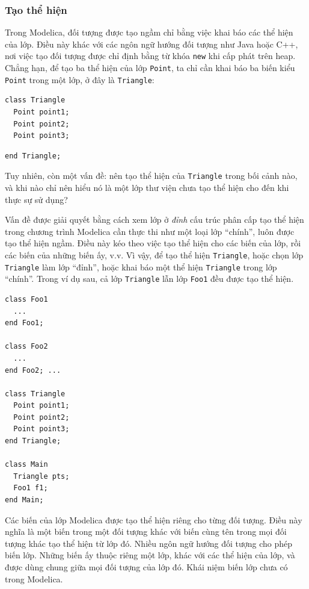 \subsubsection{Tạo thể hiện}
Trong Modelica, đối tượng được tạo ngầm chỉ bằng việc khai báo các thể hiện của lớp. Điều này khác với các ngôn ngữ hướng đối tượng như Java hoặc C++, nơi việc tạo đối tượng được chỉ định bằng từ khóa \texttt{new} khi cấp phát trên heap. Chẳng hạn, để tạo ba thể hiện của lớp \texttt{Point}, ta chỉ cần khai báo ba biến kiểu \texttt{Point} trong một lớp, ở đây là \texttt{Triangle}:
\begin{verbatim}
class Triangle
  Point point1;
  Point point2;
  Point point3;
\end{verbatim}
\begin{verbatim}
end Triangle;
\end{verbatim}
Tuy nhiên, còn một vấn đề: nên tạo thể hiện của \texttt{Triangle} trong bối cảnh nào, và khi nào chỉ nên hiểu nó là một lớp thư viện chưa tạo thể hiện cho đến khi thực sự sử dụng?

Vấn đề được giải quyết bằng cách xem lớp ở \emph{đỉnh} cấu trúc phân cấp tạo thể hiện trong chương trình Modelica cần thực thi như một loại lớp ``chính'', luôn được tạo thể hiện ngầm. Điều này kéo theo việc tạo thể hiện cho các biến của lớp, rồi các biến của những biến ấy, v.v. Vì vậy, để tạo thể hiện \texttt{Triangle}, hoặc chọn lớp \texttt{Triangle} làm lớp ``đỉnh'', hoặc khai báo một thể hiện \texttt{Triangle} trong lớp ``chính''. Trong ví dụ sau, cả lớp \texttt{Triangle} lẫn lớp \texttt{Foo1} đều được tạo thể hiện.
\begin{verbatim}
class Foo1
  ...
end Foo1;

class Foo2
  ...
end Foo2; ...

class Triangle
  Point point1;
  Point point2;
  Point point3;
end Triangle;

class Main
  Triangle pts;
  Foo1 f1;
end Main;
\end{verbatim}
Các biến của lớp Modelica được tạo thể hiện riêng cho từng đối tượng. Điều này nghĩa là một biến trong một đối tượng khác với biến cùng tên trong mọi đối tượng khác tạo thể hiện từ lớp đó. Nhiều ngôn ngữ hướng đối tượng cho phép biến lớp. Những biến ấy thuộc riêng một lớp, khác với các thể hiện của lớp, và được dùng chung giữa mọi đối tượng của lớp đó. Khái niệm biến lớp chưa có trong Modelica.

